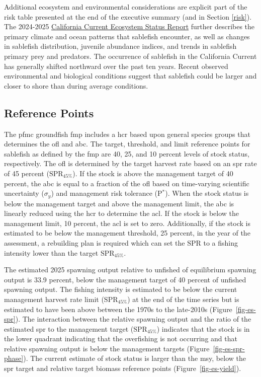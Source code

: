 \documentclass[
  english,
]{article}
\begin{document}
Additional ecosystem and environmental considerations are explicit part
of the risk table presented at the end of the executive summary (and in
Section \ref{risk}). The 2024-2025
\href{https://www.pcouncil.org/documents/2025/02/f-1-a-cciea-report-1-2024-2025-california-current-ecosystem-status-report.pdf/}{California
Current Ecosystem Status Report} further describes the primary climate
and ocean patterns that sablefish encounter, as well as changes in
sablefish distribution, juvenile abundance indices, and trends in
sablefish primary prey and predators. The occurrence of sablefish in the
California Current has generally shifted northward over the past ten
years. Recent observed environmental and biological conditions suggest
that sablefish could be larger and closer to shore than during average
conditions.

\subsection*{Reference Points}\label{reference-points}

The \gls{pfmc} groundfish \gls{fmp} includes a \gls{hcr} based upon
general species groups that determines the \gls{ofl} and \gls{abc}. The
target, threshold, and limit reference points for sablefish as defined
by the \gls{fmp} are 40, 25, and 10 percent levels of stock status,
respectively. The \gls{ofl} is determined by the target harvest rate
based on an \gls{spr} rate of 45 percent (\(\text{SPR}_{45\%}\)). If the
stock is above the management target of 40 percent, the \gls{abc} is
equal to a fraction of the \gls{ofl} based on time-varying scientific
uncertainty (\(\sigma_y\)) and management risk tolerance (P\(^*\)). When
the stock status is below the management target and above the management
limit, the \gls{abc} is linearly reduced using the \gls{hcr} to
determine the \gls{acl}. If the stock is below the management limit, 10
percent, the \gls{acl} is set to zero. Additionally, if the stock is
estimated to be below the management threshold, 25 percent, in the year
of the assessment, a rebuilding plan is required which can set the
\(\text{SPR}\) to a fishing intensity lower than the target
\(\text{SPR}_{45\%}\).

The estimated 2025 spawning output relative to unfished of equilibrium
spawning output is 33.9 percent, below the management target of 40
percent of unfished spawning output. The fishing intensity is estimated
to be below the current management harvest rate limit
(\(\text{SPR}_{45\%}\)) at the end of the time series but is estimated
to have been above between the 1970s to the late-2010s
(Figure~\ref{fig-es-spr}). The interaction between the relative spawning
output and the ratio of the estimated \gls{spr} to the management target
(\(\text{SPR}_{45\%}\)) indicates that the stock is in the lower
quadrant indicating that the overfishing is not occurring and that
relative spawning output is below the management targets
(Figure~\ref{fig-es-spr-phase}). The current estimate of stock status is
larger than the \gls{msy}, below the \gls{spr} target and relative
target biomass reference points (Figure~\ref{fig-es-yield}).
\end{document}
